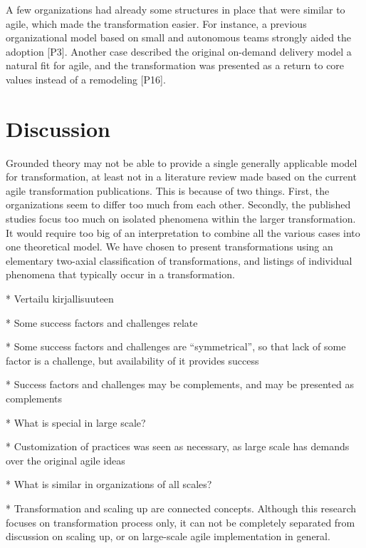 \documentclass[preprint,authoryear,12pt]{elsarticle}
\begin{document}

A few organizations had already some structures in place that were similar to
agile, which made the transformation easier.
For instance, a previous organizational model based on small and autonomous
teams strongly aided the adoption [P3].
Another case described the original on-demand delivery model a natural fit for
agile, and the transformation was presented as a return to core values instead
of a remodeling [P16].


\clearpage

\section{Discussion}
\label{sec:discussion}

Grounded theory may not be able to provide a single generally applicable model
for transformation, at least not in a literature review made based on the
current agile transformation publications. This is because of two things.
First, the organizations seem to differ too much from each other. Secondly, the
published studies focus too much on isolated phenomena within the larger
transformation.
It would require too big of an interpretation to combine all the various cases
into one theoretical model. We have chosen to present transformations using an
elementary two-axial classification of transformations, and listings of
individual phenomena that typically occur in a transformation.

* Vertailu kirjallisuuteen

* Some success factors and challenges relate

* Some success factors and challenges are ``symmetrical'', so that lack of some
  factor is a challenge, but availability of it provides success

* Success factors and challenges may be complements, and may be presented as
  complements

* What is special in large scale?

* Customization of practices was seen as necessary, as large scale has demands
  over the original agile ideas

* What is similar in organizations of all scales?

* Transformation and scaling up are connected concepts. Although this research
  focuses on transformation process only, it can not be completely separated
  from discussion on scaling up, or on large-scale agile implementation in
  general.
\end{document}

